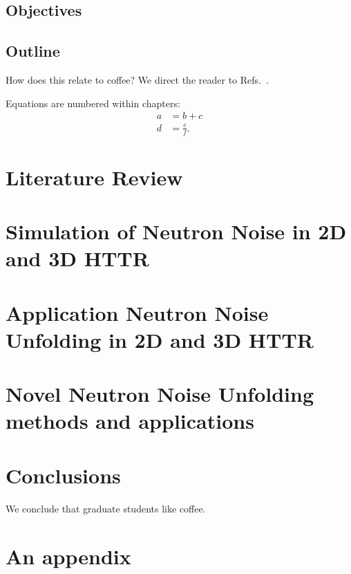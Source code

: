 \documentclass{uiucthesis2021}
\newcounter{counterforappendices}
\begin{document}
\section{Objectives}

\section{Outline}

How does this relate to coffee? We direct the reader to Refs.~\cite{Trembly98,Childish07,Presso10}.

Equations are numbered within chapters:
\begin{align}
    a
    &= b + c \\
    d
    &= \frac{e}{f}.
\end{align}

% 
% 
% 
% 

\chapter{Literature Review}

\chapter{Simulation of Neutron Noise in 2D and 3D HTTR}

\chapter{Application Neutron Noise Unfolding in 2D and 3D HTTR}


\chapter{Novel Neutron Noise Unfolding methods and applications}


\chapter{Conclusions}

We conclude that graduate students like coffee.


\backmatter

\printbibliography[heading=bibintoc,title={References}]

\clearpage
\setcounter{counterforappendices}{\value{page}}
\mainmatter
\setcounter{page}{\value{counterforappendices}}

\appendix

\chapter{An appendix}

\lipsum[1-5]

% 
\end{document}
